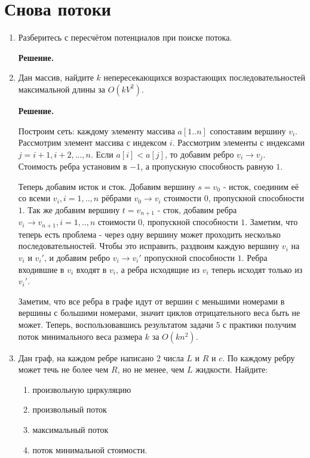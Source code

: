 \section*{Снова потоки}
\begin{enumerate}
	\item Разберитесь с пересчётом потенциалов при поиске потока.
	
	\textbf{Решение.}
	
	\item Дан массив, найдите $k$ непересекающихся возрастающих последовательностей максимальной длины за $O(kV^2)$.
	
	\textbf{Решение.}
	
	Построим сеть: каждому элементу массива $a[1..n]$ сопоставим вершину $v_i$. Рассмотрим элемент массива с 
	индексом $i$. Рассмотрим элементы с индексами $j = i + 1, i + 2, ..., n$. Если $a[i] < a[j]$, то добавим ребро 
	$v_i \to v_j$. Стоимость ребра установим в $-1$, а пропускную способность равную $1$. 
	
	Теперь добавим исток и сток. Добавим вершину $s = v_0$ - исток, соединим её со всеми $v_i, i = 1,..,n$ рёбрами 
	$v_0 \to v_i$ стоимости 0, пропускной способности $1$. Так же добавим вершину $t = v_{n + 1}$ - сток, добавим 
	ребра $v_i \to v_{n + 1}, i = 1,..,n$ стоимости $0$, пропускной способности $1$. Заметим, что теперь есть 
	проблема - через одну вершину может проходить несколько последовательностей. Чтобы это исправить, раздвоим 
	каждую вершину $v_i$ на $v_i$ и $v_i'$, и добавим ребро $v_i \to v_i'$ пропускной способности $1$. Ребра 
	входившие в $v_i$ входят в $v_i$, а ребра исходящие из $v_i$ теперь исходят только из $v_i'$.  
	
	Заметим, что все ребра в графе идут от вершин с меньшими номерами в вершины с большими номерами, значит циклов 
	отрицательного веса быть не может. Теперь, воспользовавшись результатом задачи $5$ с практики получим поток 
	минимального веса размера $k$ за $O(kn^2)$.

	
	\item Дан граф, на каждом ребре написано $2$ числа $L$ и $R$ и $c$. По каждому ребру может течь не более
	чем $R$, но не менее, чем $L$ жидкости. Найдите:
	\begin{enumerate}
		\item произвольную циркуляцию
		\item произвольный поток
		\item максимальный поток
		\item поток минимальной стоимости.
	\end{enumerate}
	

\end{enumerate}
